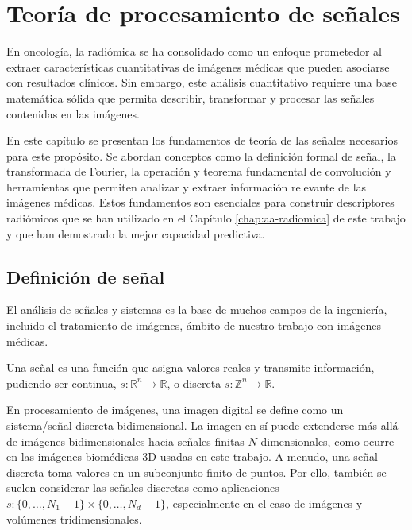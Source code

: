 
\chapter{Teoría de procesamiento de señales} \label{chap:señales}
En oncología, la radiómica se ha consolidado como un enfoque prometedor al extraer características cuantitativas de imágenes médicas que pueden asociarse con resultados clínicos. Sin embargo, este análisis cuantitativo requiere una base matemática sólida que permita describir, transformar y procesar las señales contenidas en las imágenes.

En este capítulo se presentan los fundamentos de teoría de las señales necesarios para este propósito. Se abordan conceptos como la definición formal de señal, la transformada de Fourier, la operación y teorema fundamental de convolución y herramientas que permiten analizar y extraer información relevante de las imágenes médicas. Estos fundamentos son esenciales para construir descriptores radiómicos que se han utilizado en el Capítulo \ref{chap:aa-radiomica} de este trabajo y que han demostrado la mejor capacidad predictiva.

\section{Definición de señal}
El análisis de señales y sistemas es la base de muchos campos de la ingeniería, incluido el tratamiento de imágenes, ámbito de nuestro trabajo con imágenes médicas. 

\begin{definicion}
Una señal es una función que asigna valores reales y transmite información, pudiendo ser continua, $s : \mathbb{R}^n \rightarrow \mathbb{R}$, o discreta $s : \mathbb{Z}^n \rightarrow \mathbb{R}$.
\end{definicion}

En procesamiento de imágenes, una imagen digital se define como un sistema/señal discreta bidimensional. La imagen en sí puede extenderse más allá de imágenes bidimensionales hacia señales finitas $N$-dimensionales, como ocurre en las imágenes biomédicas 3D usadas en este trabajo. A menudo, una señal discreta toma valores en un subconjunto finito de puntos. Por ello, también se suelen considerar las señales discretas como aplicaciones $s: \{0, \dots, N_1-1\} \times \{0, \dots, N_d-1\}$, especialmente en el caso de imágenes y volúmenes tridimensionales.

